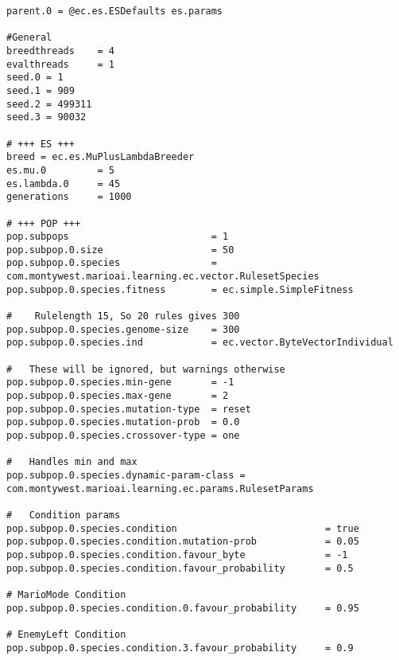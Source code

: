 \begin{minipage}{0.9\linewidth}
\begin{lstlisting}
parent.0 = @ec.es.ESDefaults es.params

#General
breedthreads 	= 4
evalthreads 	= 1
seed.0 = 1
seed.1 = 909
seed.2 = 499311
seed.3 = 90032

# +++ ES +++
breed = ec.es.MuPlusLambdaBreeder
es.mu.0 		= 5
es.lambda.0 	= 45
generations 	= 1000

# +++ POP +++
pop.subpops 						= 1
pop.subpop.0.size 					= 50
pop.subpop.0.species 				= com.montywest.marioai.learning.ec.vector.RulesetSpecies
pop.subpop.0.species.fitness		= ec.simple.SimpleFitness

#	 Rulelength 15, So 20 rules gives 300
pop.subpop.0.species.genome-size 	= 300
pop.subpop.0.species.ind 			= ec.vector.ByteVectorIndividual

#	These will be ignored, but warnings otherwise 
pop.subpop.0.species.min-gene		= -1
pop.subpop.0.species.max-gene		= 2
pop.subpop.0.species.mutation-type	= reset
pop.subpop.0.species.mutation-prob  = 0.0
pop.subpop.0.species.crossover-type = one

#	Handles min and max
pop.subpop.0.species.dynamic-param-class = com.montywest.marioai.learning.ec.params.RulesetParams

#	Condition params
pop.subpop.0.species.condition							= true
pop.subpop.0.species.condition.mutation-prob 			= 0.05
pop.subpop.0.species.condition.favour_byte 				= -1
pop.subpop.0.species.condition.favour_probability 		= 0.5

# MarioMode Condition
pop.subpop.0.species.condition.0.favour_probability 	= 0.95

# EnemyLeft Condition
pop.subpop.0.species.condition.3.favour_probability 	= 0.9
\end{lstlisting}
\end{minipage}

